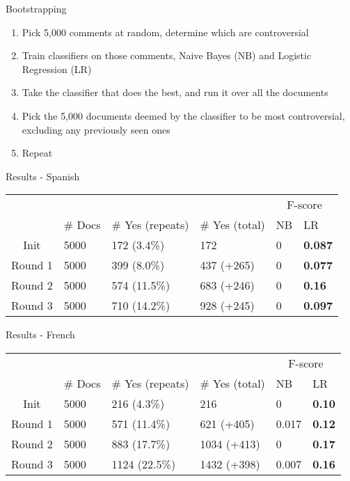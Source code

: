 \documentclass{beamer}
\begin{document}
\begin{frame}{Bootstrapping}
\begin{enumerate}
\item Pick 5,000 comments at random, determine which are controversial 
\item Train classifiers on those comments, Naive Bayes (NB) and Logistic Regression (LR)
\item Take the classifier that does the best, and run it over all the documents
\item Pick the 5,000 documents deemed by the classifier to be most controversial, excluding any previously seen ones
\item Repeat
\end{enumerate}
\end{frame}

\begin{frame}{Results - Spanish}
\begin{center}
\begin{tabular}{|c|l|l|l|l|l|}
\rowcolor{gray!50} &&&& \multicolumn{2}{|c|}{F-score} \\
\rowcolor{gray!50} & \# Docs & \# Yes (repeats) & \# Yes (total) & NB & LR \\
Init & 5000 & 172 (3.4\%)& 172 & 0 & \textbf{0.087} \\
Round 1 & 5000 & 399 (8.0\%) & 437 (+265)& 0 & \textbf{0.077} \\
Round 2 & 5000 & 574 (11.5\%) & 683 (+246) & 0 & \textbf{0.16} \\
Round 3 & 5000 & 710 (14.2\%) & 928 (+245) & 0 & \textbf{0.097} \\
\end{tabular}
\end{center}
\end{frame}

\begin{frame}{Results - French}
\begin{center}
\begin{tabular}{|c|l|l|l|l|l|}
\rowcolor{gray!50} &&&& \multicolumn{2}{|c|}{F-score} \\
\rowcolor{gray!50} & \# Docs & \# Yes (repeats) & \# Yes (total) & NB & LR \\
Init & 5000 & 216 (4.3\%) & 216 & 0 & \textbf{0.10} \\
Round 1 & 5000 &  571 (11.4\%) & 621 (+405)& 0.017 & \textbf{0.12} \\
Round 2 & 5000 & 883 (17.7\%) & 1034 (+413)& 0 & \textbf{0.17} \\
Round 3 & 5000 & 1124 (22.5\%) & 1432 (+398) & 0.007 & \textbf{0.16} \\
\end{tabular}
\end{center}
\end{frame}
\end{document}
